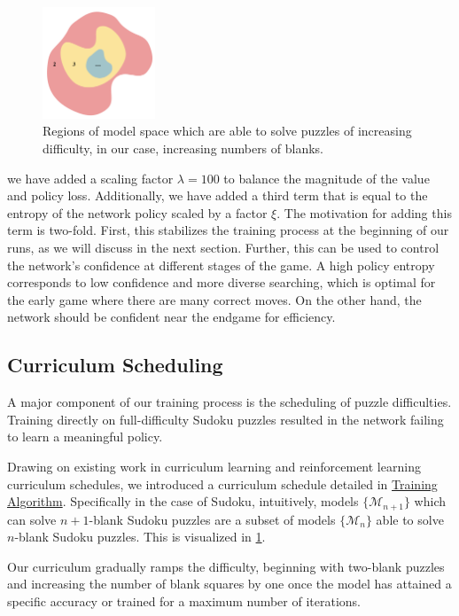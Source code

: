 \documentclass[10pt, reqno, letterpaper, twoside]{amsart}
\begin{document}
\begin{figure} %
    \centering
    \includegraphics[width=0.3\textwidth]{images/blobs.png}
    \caption{Regions of model space which are able to solve puzzles of increasing difficulty, in our case, increasing numbers of blanks.}
    \label{fig:blobs}
\end{figure}

we have added a scaling factor $\lambda = 100 $ to balance the magnitude of the value and policy loss. Additionally, we have added a third term that is equal to the entropy of the network policy scaled by a factor $\xi$. The motivation for adding this term is two-fold. First, this stabilizes the training process at the beginning of our runs, as we will discuss in the next section. Further, this can be used to control the network's confidence at different stages of the game. A high policy entropy corresponds to low confidence and more diverse searching, which is optimal for the early game where there are many correct moves. On the other hand, the network should be confident near the endgame for efficiency. 

\subsection{Curriculum Scheduling}

A major component of our training process is the scheduling of puzzle difficulties. Training directly on full-difficulty Sudoku puzzles resulted in the network failing to learn a meaningful policy.

Drawing on existing work in curriculum learning and reinforcement learning curriculum schedules, we introduced a curriculum schedule detailed in \hyperref[algo:algo1]{Training Algorithm}. Specifically in the case of Sudoku, intuitively, models $\{\mathcal{M}_{n+1}\}$ which can solve $n+1$-blank Sudoku puzzles are a subset of models $\{\mathcal{M}_{n}\}$ able to solve $n$-blank Sudoku puzzles. This is visualized in \ref{fig:blobs}.


Our curriculum gradually ramps the difficulty, beginning with two-blank puzzles and increasing the number of blank squares by one once the model has attained a specific accuracy or trained for a maximum number of iterations.
\end{document}
